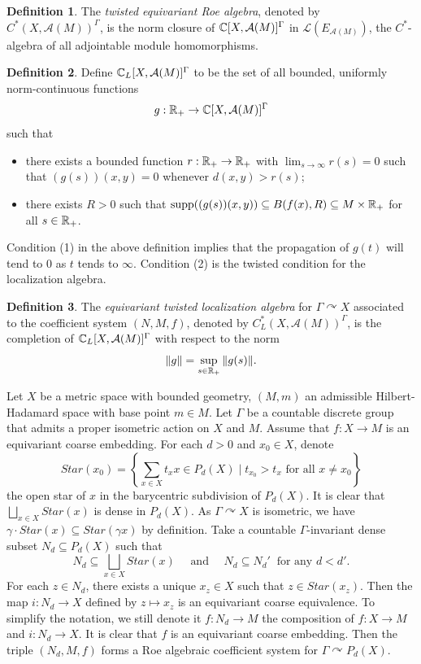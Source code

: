 \documentclass[11pt]{article}
\theoremstyle{definition}
\newtheorem{Def}{Definition}[section]
\theoremstyle{plain}
\def\A{\mathcal A}\def\C{\mathcal C}\def\B{\mathcal B}\def\E{\mathcal E}\def\O{\mathcal O}\def\h{\mathfrak h}\def\K{\mathcal K}\def\F{\mathcal F}\def\P{\mathcal P}\def\L{\mathcal L}\def\R{\mathcal R}\def\Q{\mathcal Q}\def\H{\mathcal H}\def\S{\mathcal S}\def\N{\mathcal N}\def\U{\mathcal U}\def\V{\mathcal V}
\def\supp{\textup{supp}}
\def\Ga{\Gamma}
\def\car{\curvearrowright}
\begin{document}
\begin{Def}
The \emph{twisted equivariant Roe algebra}, denoted by $C^*(X,\A(M))^{\Ga}$, is the norm closure of $\IC[X,\A(M)]^{\Ga}$ in $\L\left(E_{\A(M)}\right)$, the $C^*$-algebra of all adjointable module homomorphisms.
\end{Def}

\begin{Def}\label{twisted localization small}
Define $\IC_L[X,\A(M)]^{\Ga}$ to be the set of all bounded, uniformly norm-continuous functions
$$g:\IR_+\to\IC[X,\A(M)]^{\Ga}$$
such that\begin{itemize}
\item[(1)]there exists a bounded function $r:\mathbb R_+\to\mathbb R_+$ with $\lim_{s\to\infty}r(s)=0$ such that $(g(s))(x,y)=0$ whenever $d(x,y)>r(s)$;
\item[(2)]there exists $R>0$ such that $\supp((g(s))(x,y))\subseteq B(f(x),R)\subseteq M\times\IR_+$ for all $s\in\mathbb R_+$.
\end{itemize}\end{Def}

Condition (1) in the above definition implies that the propagation of $g(t)$ will tend to 0 as $t$ tends to $\infty$. Condition (2) is the twisted condition for the localization algebra.

\begin{Def}
The \emph{equivariant twisted localization algebra} for $\Ga\car X$ associated to the coefficient system $(N,M,f)$, denoted by $C^*_L(X,\A(M))^{\Ga}$, is the completion of $\IC_L[X,\A(M)]^{\Ga}$ with respect to the norm
$$\|g\|=\sup_{s\in\mathbb R_+}\|g(s)\|.$$
\end{Def}

Let $X$ be a metric space with bounded geometry, $(M,m)$ an admissible Hilbert-Hadamard space with base point $m\in M$. Let $\Ga$ be a countable discrete group that admits a proper isometric action on $X$ and $M$. Assume that $f: X\to M$ is an equivariant coarse embedding. For each $d>0$ and $x_0\in X$, denote
$$Star(x_0)=\left\{\sum_{x\in X}t_xx\in P_d(X)\;\Big|\;t_{x_0}>t_x\text{ for all }x\ne x_0\right\}$$
the open star of $x$ in the barycentric subdivision of $P_d(X)$. It is clear that $\bigsqcup_{x\in X}Star(x)$ is dense in $P_d(X)$. As $\Ga\car X$ is isometric, we have $\gamma\cdot Star(x)\subseteq Star(\gamma x)$ by definition. Take a countable $\Ga$-invariant dense subset $N_d\subseteq P_d(X)$ such that
$$N_d\subseteq\bigsqcup_{x\in X} Star(x)\quad\text{ and }\quad N_d\subseteq N_d'\ \text{ for any }d< d'.$$
For each $z\in N_d$, there exists a unique $x_z\in X$ such that $z\in Star(x_z)$. Then the map $i: N_d\to X$ defined by $z\mapsto x_z$ is an equivariant coarse equivalence. To simplify the notation, we still denote it $f: N_d\to M$ the composition of $f: X\to M$ and $i: N_d\to X$. It is clear that $f$ is an equivariant coarse embedding. Then the triple $(N_d,M,f)$ forms a Roe algebraic coefficient system for $\Ga\car P_d(X)$.
\end{document}
